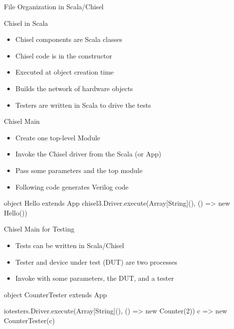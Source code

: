 \begin{frame}[fragile]{File Organization in Scala/Chisel}
\end{frame}

\begin{frame}[fragile]{Chisel in Scala}
\begin{itemize}
\item Chisel components are Scala classes
\item Chisel code is in the constructor
\item Executed at object creation time
\item Builds the network of hardware objects
\item Testers are written in Scala to drive the tests
\end{itemize}
\end{frame}

\begin{frame}[fragile]{Chisel Main}

\begin{itemize}
\item Create one top-level Module
\item Invoke the Chisel driver from the Scala  (or App)
\item Pass some parameters and the top module
\item Following code generates Verilog code
\end{itemize}
\begin{chisel}
object Hello extends App {
  chisel3.Driver.execute(Array[String](), () => new Hello())
}
\end{chisel}
\end{frame}

\begin{frame}[fragile]{Chisel Main for Testing}
\begin{itemize}
\item Tests can be written in Scala/Chisel
\item Tester and device under test (DUT) are two processes
\item Invoke  with some parameters, the DUT, and a tester
\end{itemize}
\begin{chisel}
object CounterTester extends App {

  iotesters.Driver.execute(Array[String](), () => new Counter(2)) {
    c => new CounterTester(c)
  }
}
\end{chisel}
\end{frame}


